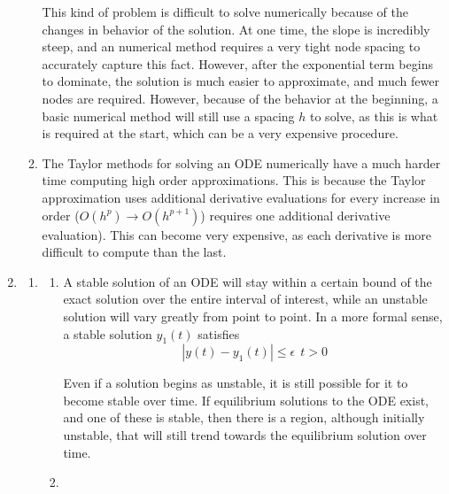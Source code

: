 \documentclass[11pt]{article}
\begin{document}
\begin{enumerate}
\begin{enumerate}
		This kind of problem is difficult to solve numerically because of the changes in behavior of the solution. At one time, the slope is incredibly steep, and an numerical method requires a very tight node spacing to accurately capture this fact. However, after the exponential term begins to dominate, the solution is much easier to approximate, and much fewer nodes are required. However, because of the behavior at the beginning, a basic numerical method will still use a spacing $h$ to solve, as this is what is required at the start, which can be a very expensive procedure.

		\medskip

		\item The Taylor methods for solving an ODE numerically have a much harder time computing high order approximations. This is because the Taylor approximation uses additional derivative evaluations for every increase in order ($O(h^p)\to O(h^{p+1})$) requires one additional derivative evaluation). This can become very expensive, as each derivative is more difficult to compute than the last.

		\medskip

	\end{enumerate}

	\item %

	\begin{enumerate}

		\item %

		\begin{enumerate}

			\item A stable solution of an ODE will stay within a certain bound of the exact solution over the entire interval of interest, while an unstable solution will vary greatly from point to point. In a more formal sense, a stable solution $y_1(t)$ satisfies
			\[
			|y(t)-y_1(t)| \leq \epsilon\ \ t > 0
			\]

			Even if a solution begins as unstable, it is still possible for it to become stable over time. If equilibrium solutions to the ODE exist, and one of these is stable, then there is a region, although initially unstable, that will still trend towards the equilibrium solution over time.

			\medskip

			\item

			\begin{itemize}


\end{itemize}
\end{enumerate}
\end{enumerate}
\end{enumerate}
\end{document}
